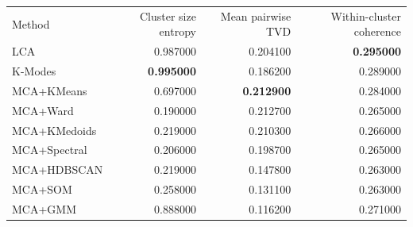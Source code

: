 \begin{tabular}{lrrr}
Method & Cluster size entropy & Mean pairwise TVD & Within-cluster coherence \\
LCA & 0.987000 & 0.204100 & \bfseries 0.295000 \\
K-Modes & \bfseries 0.995000 & 0.186200 & 0.289000 \\
MCA+KMeans & 0.697000 & \bfseries 0.212900 & 0.284000 \\
MCA+Ward & 0.190000 & 0.212700 & 0.265000 \\
MCA+KMedoids & 0.219000 & 0.210300 & 0.266000 \\
MCA+Spectral & 0.206000 & 0.198700 & 0.265000 \\
MCA+HDBSCAN & 0.219000 & 0.147800 & 0.263000 \\
MCA+SOM & 0.258000 & 0.131100 & 0.263000 \\
MCA+GMM & 0.888000 & 0.116200 & 0.271000 \\
\end{tabular}
